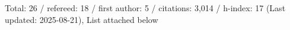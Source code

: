 Total: 26 / refereed: 18 / first author: 5 / citations: 3,014 / h-index: 17 (Last updated: 2025-08-21), List attached below